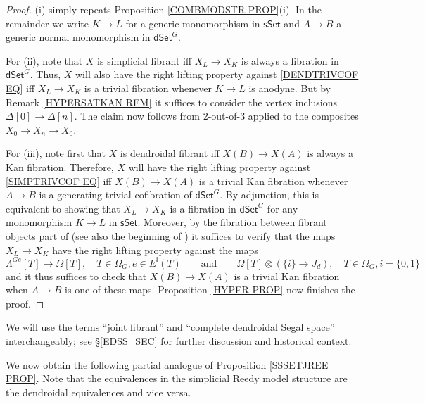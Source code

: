 \documentclass[a4paper,10pt
,draft
]{article}%
\begin{document}
\begin{proof}
(i) simply repeats Proposition \ref{COMBMODSTR PROP}(i). In the remainder we write $K \to L$ for a generic monomorphism in 
$\mathsf{sSet}$
and $A \to B$ a generic normal monomorphism in $\mathsf{dSet}^G$.

For (ii), note that $X$ is simplicial fibrant iff 
$X_L \to X_K$ is always a fibration in $\mathsf{dSet}^G$. 
Thus, $X$ will also have the right lifting property against  \eqref{DENDTRIVCOF EQ} iff 
$X_L \to X_K$ is a trivial fibration whenever $K \to L$ is anodyne. But by Remark \ref{HYPERSATKAN REM}
it suffices to consider the vertex inclusions $\Delta[0] \to \Delta[n]$.
The claim now follows from 2-out-of-3 applied to the composites $X_0 \to X_n \to X_0$.

For (iii), note first that $X$ is dendroidal fibrant iff $X(B) \to X(A)$ is always a Kan fibration.
Therefore, $X$ will have the right lifting property against \eqref{SIMPTRIVCOF EQ} iff 
$X(B) \to X(A)$ is a trivial Kan fibration whenever $A\to B$ is a generating trivial cofibration of $\mathsf{dSet}^G$.
By adjunction, this is equivalent to showing that
$X_L \to X_K$ is a fibration in $\mathsf{dSet}^G$ for any monomorphism $K \to L$ in $\mathsf{sSet}$. Moreover, by the fibration between fibrant objects part of \cite[Prop. 8.8]{Per17}
(see also the beginning of \cite[\S 8.1]{Per17})
it suffices to verify that the maps $X_L \to X_K$ have the right lifting property against the maps
\[
	\Lambda^{G e} [T] \to \Omega[T],
	\quad
	T \in \Omega_G, e \in E^{\mathsf{i}}(T)
\qquad
\text{and}
\qquad
	\Omega[T] \otimes \left( \{i\} \to J_d\right),
	\quad
	T \in \Omega_G, i = \{0,1\}
\]
and it thus suffices to check that $X(B) \to X(A)$ is a trivial Kan fibration when $A\to B$ is one of these maps.
Proposition \ref{HYPER PROP} now finishes the proof.
\end{proof}

\begin{remark}
      We will use the terms ``joint fibrant'' and ``complete dendroidal Segal space'' interchangeably;
      see \S \ref{EDSS_SEC} for further discussion and historical context. 
\end{remark}

We now obtain the following partial analogue of Proposition \ref{SSSETJREE PROP}. Note that the equivalences in the simplicial Reedy model structure are the dendroidal equivalences and vice versa.
\end{document}
